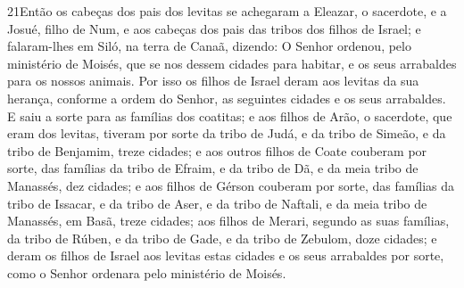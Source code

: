 \medskip

\lettrine{21} Então os cabeças dos pais dos levitas se
achegaram a Eleazar, o sacerdote, e a Josué, filho de Num, e aos
cabeças dos pais das tribos dos filhos de Israel; e falaram-lhes
em Siló, na terra de Canaã, dizendo: O Senhor ordenou, pelo
ministério de Moisés, que se nos dessem cidades para habitar, e os
seus arrabaldes para os nossos animais. Por isso os filhos de
Israel deram aos levitas da sua herança, conforme a ordem do Senhor,
as seguintes cidades e os seus arrabaldes. E saiu a sorte para
as famílias dos coatitas; e aos filhos de Arão, o sacerdote, que
eram dos levitas, tiveram por sorte da tribo de Judá, e da tribo de
Simeão, e da tribo de Benjamim, treze cidades; e aos outros
filhos de Coate couberam por sorte, das famílias da tribo de Efraim,
e da tribo de Dã, e da meia tribo de Manassés, dez cidades; e
aos filhos de Gérson couberam por sorte, das famílias da tribo de
Issacar, e da tribo de Aser, e da tribo de Naftali, e da meia tribo
de Manassés, em Basã, treze cidades; aos filhos de Merari,
segundo as suas famílias, da tribo de Rúben, e da tribo de Gade, e
da tribo de Zebulom, doze cidades; e deram os filhos de Israel
aos levitas estas cidades e os seus arrabaldes por sorte, como o
Senhor ordenara pelo ministério de Moisés.

